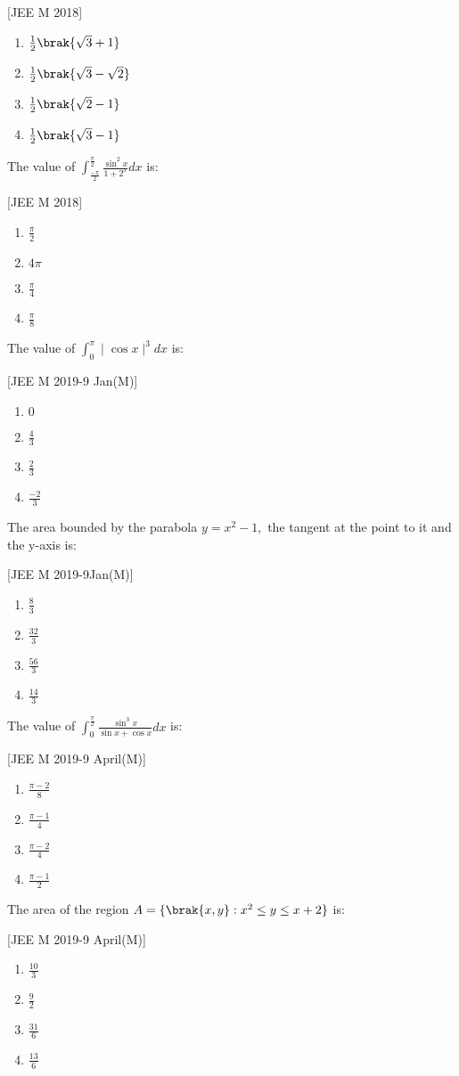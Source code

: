 		\hfill{[JEE M 2018]}
		\begin{enumerate}
			\item $\frac{1}{2}\brak{\sqrt{3}+1}$
			\item $\frac{1}{2}\brak{\sqrt{3}-\sqrt{2}}$
			\item $\frac{1}{2}\brak{\sqrt{2}-1}$
			\item $\frac{1}{2}\brak{\sqrt{3}-1}$
		\end{enumerate}
	\item The value of $\int_{\frac{-\pi}{2}}^{\frac{\pi}{2}}\frac{\sin^{2} x}{1+2^{x}}dx$ is:

		\hfill{[JEE M 2018]}
		\begin{enumerate}
			\item $\frac{\pi}{2}$
			\item $4\pi$
			\item $\frac{\pi}{4}$
			\item $\frac{\pi}{8}$
		\end{enumerate}
	\item The value of $\int_{0}^{\pi}\mid{\cos x}\mid^{3}dx$ is:

		\hfill{[JEE M 2019-9 Jan(M)]}
		\begin{enumerate}
			\item $0$
			\item $\frac{4}{3}$
			\item $\frac{2}{3}$
			\item $\frac{-2}{3}$
		\end{enumerate}
	\item The area  bounded by the parabola $y=x^{2}-1,$ the tangent at the point  to it and the y-axis is:

		\hfill{[JEE M 2019-9Jan(M)]}
		\begin{enumerate}
			\item $\frac{8}{3}$
			\item $\frac{32}{3}$
			\item $\frac{56}{3}$
			\item $\frac{14}{3}$
		\end{enumerate}
	\item The value of $\int_{0}^{\frac{\pi}{2}}\frac{\sin^{3} x}{\sin x + \cos x}dx$ is:

		\hfill{[JEE M 2019-9 April(M)]}
		\begin{enumerate}
			\item $\frac{\pi-2}{8}$
			\item $\frac{\pi-1}{4}$
			\item $\frac{\pi-2}{4}$
			\item $\frac{\pi-1}{2}$
		\end{enumerate}
	\item The area  of the region $A=\{\brak{x,y}:x^{2}\leq y\leq x+2\}$ is:

		\hfill{[JEE M 2019-9 April(M)]}
		\begin{enumerate}
			\item $\frac{10}{3}$
			\item $\frac{9}{2}$
			\item $\frac{31}{6}$
			\item $\frac{13}{6}$
		\end{enumerate}


